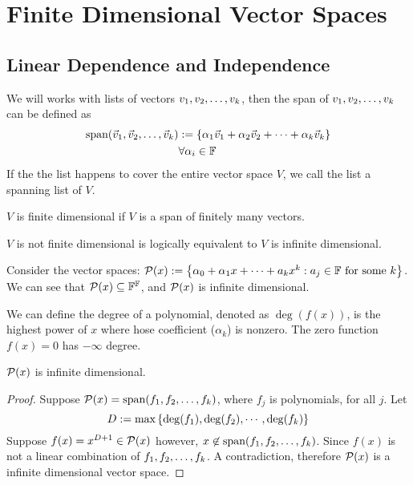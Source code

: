 \section{Finite Dimensional Vector Spaces}
\subsection{Linear Dependence and Independence} 
\begin{definition}
    We will works with lists of vectors ${v}_1,{v}_2, \ldots, {v}_{k}$, then the span of ${v}_1,{v}_2, \ldots, {v}_{k}$ can be defined as
    \begin{align*}
         \text{span} ({\vec v}_1,{\vec v}_2, \ldots, {\vec v}_{k}) &:= \left\{ \alpha_1\vec v_1 + \alpha_2 \vec v_2 + \cdots  + \alpha_k \vec v_k \right\} \\
        & \forall \alpha_i \in \mathbb F 
    \end{align*}
    If the the list happens to cover the entire vector space $V$, we call the list a spanning list of $V$.
\end{definition}
\begin{definition}
    $V$ is finite dimensional if $V$ is a span of finitely many vectors.
\end{definition}
\begin{remark}
    $V$ is not finite dimensional is logically equivalent to $V$ is infinite dimensional.
\end{remark}
\begin{example}
    Consider the vector spaces: $\mathcal P(x) : = \left\{ \alpha_0 + \alpha_1 x + \cdots + a_kx^k : a_j \in \mathbb F \text{ for some } k \right\}$. We can see that $\mathcal P(x) \subseteq \mathbb F^{\mathbb F}$, and $\mathcal P(x)$ is infinite dimensional.
\end{example}
\begin{definition}
    We can define the degree of a polynomial, denoted as $\deg(f(x))$, is the highest power of $x$ where hose coefficient ($\alpha_k$) is nonzero. The zero function $f(x) = 0$ has $-\infty$ degree. 
\end{definition} 
\begin{example}
    $\mathcal P(x)$ is infinite dimensional.
\end{example}
\begin{proof}
    Suppose $\mathcal P(x) = \text{span}({f}_1,{f}_2, \ldots, {f}_{k})$, where $f_j$ is polynomials, for all $j$. 
    Let \[D := \text{max}\left\{\deg(f_1), \deg(f_2), \cdots, \deg(f_k)\right\}\] Suppose $f(x) =  x^{D + 1} \in \mathcal P(x)$ however, $x \not\in \text{span}({f}_1,{f}_2, \ldots, {f}_{k})$. Since $f(x)$ is not a linear combination of ${f}_1,{f}_2, \ldots, {f}_{k}$. A contradiction, therefore $\mathcal P(x)$ is a infinite dimensional vector space.
\end{proof}
